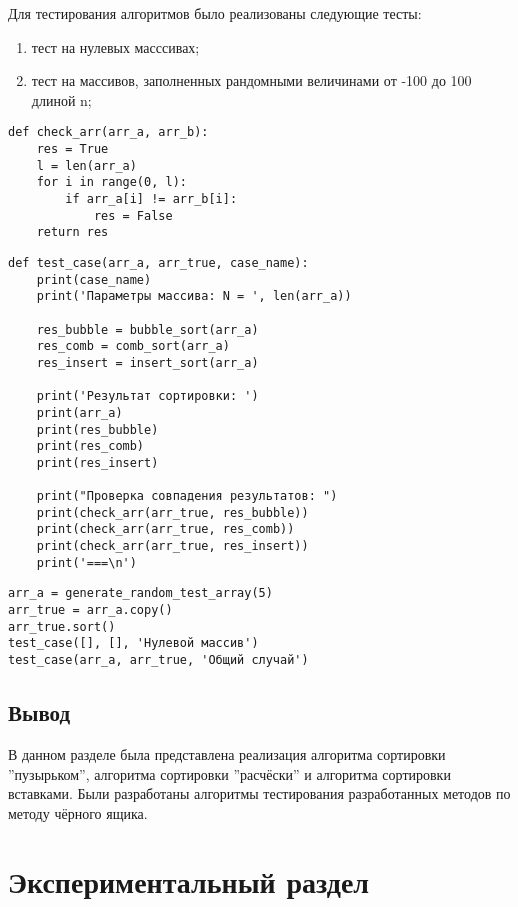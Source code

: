 Для тестирования алгоритмов было реализованы следующие тесты:
\begin{enumerate}
	\item тест на нулевых масссивах;
	\item тест на массивов, заполненных рандомными величинами от -100 до 100 длиной n;
\end{enumerate}

\begin{lstlisting}[label=some-code-5,caption=Реализация функции рандомной генерации массивов]
def check_arr(arr_a, arr_b):
    res = True
    l = len(arr_a)
    for i in range(0, l):
        if arr_a[i] != arr_b[i]:
            res = False
    return res
\end{lstlisting}

\begin{lstlisting}[label=some-code-6,caption=Реализация общей функции тестирования]        
def test_case(arr_a, arr_true, case_name):
    print(case_name)
    print('Параметры массива: N = ', len(arr_a))

    res_bubble = bubble_sort(arr_a)
    res_comb = comb_sort(arr_a)
    res_insert = insert_sort(arr_a)

    print('Результат сортировки: ')
    print(arr_a)
    print(res_bubble)
    print(res_comb)
    print(res_insert)

    print("Проверка совпадения результатов: ")
    print(check_arr(arr_true, res_bubble))
    print(check_arr(arr_true, res_comb))
    print(check_arr(arr_true, res_insert))
    print('===\n')
\end{lstlisting}

\begin{lstlisting}[label=some-code-7,caption=Реализация тестов]      
arr_a = generate_random_test_array(5)
arr_true = arr_a.copy()
arr_true.sort()
test_case([], [], 'Нулевой массив')
test_case(arr_a, arr_true, 'Общий случай')
\end{lstlisting}

\section{Вывод}
В данном разделе была представлена реализация алгоритма сортировки ''пузырьком'', алгоритма сортировки ''расчёски'' и алгоритма сортировки вставками. Были разработаны алгоритмы тестирования разработанных методов по методу чёрного ящика.

\chapter{Экспериментальный раздел}

